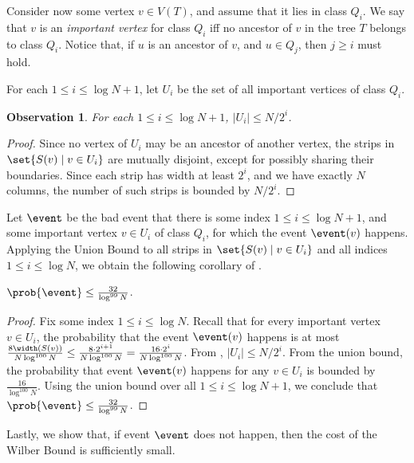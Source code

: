 \documentclass{toc}
\newtheorem{myobs}[theorem]{Observation}
\begin{document}
Consider now some vertex $v\in V(T)$, and assume that it lies in class $Q_i$. We say that $v$ is an \emph{important vertex} for class $Q_i$ iff no ancestor of $v$ in the tree $T$ belongs to class $Q_i$. Notice that, if $u$ is an ancestor of $v$, and $u\in Q_j$, then $j\geq i$ must hold.

For each $1\leq i\leq \log N+1$, let $U_i$ be the set of all important vertices of class $Q_i$. 

\begin{myobs}
\label{obs: bounded U_i} 
For each $1\leq i\leq \log N+1$, $|U_i| \leq N/2^i$. 
\end{myobs}
\begin{proof}
Since no vertex of $U_i$ may be an ancestor of another vertex, the strips in $\set{S(v)\mid v\in U_i}$ are mutually disjoint, except for possibly sharing their boundaries. 
Since each strip has width at least $2^i$, and we have exactly $N$ columns, the number of such strips is bounded by $N/2^i$. 
\end{proof}  



Let $\event$ be the bad event that there is some index $1\leq i\leq \log N+1$, and some important vertex $v\in U_i$ of class $Q_i$, for which  the event $\event(v)$ happens. 
Applying the Union Bound to all strips in $\set{S(v)\mid v\in U_i}$ and  all indices $1\leq i\leq \log N$, we obtain the following corollary of .



\begin{corollary}\label{cor: no bad important strips}
	 $\prob{\event}\leq \frac{32}{\log^{99}N}$.
\end{corollary}
\begin{proof}
	Fix some index $1\leq i\leq \log N$. Recall that for every important vertex $v\in U_i$, the probability that the event $\event(v)$ happens is at most $\frac{8\width(S(v))}{N\log^{100} N}\leq \frac{8\cdot 2^{i+1}}{N\log^{100}N}=\frac{16\cdot 2^{i}}{N\log^{100}N}$. 
From , $|U_i|\leq N/2^i$. 
From the union bound, the probability that event $\event(v)$ happens for any $v\in U_i$ is bounded by $\frac{16}{\log^{100}N}$. 
Using the union bound over all  $1\leq i\leq \log N+1$, we conclude that  $\prob{\event}\leq \frac{32}{\log^{99}N}$.
\end{proof}



Lastly, we show that, if event $\event$ does not happen, then the cost of the Wilber Bound is sufficiently small.
	
\end{document}

